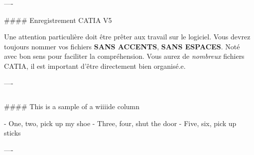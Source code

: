 \documentclass{beamer}
\begin{document}
\begin{frame}[fragile]
\begin{columns}[T]
\begin{column}{.46\textwidth}
\begin{markdown}
----


#### Enregistrement CATIA V5

Une attention particulière doit être prêter aux travail sur le logiciel. Vous devrez toujours nommer vos fichiers \textbf{SANS ACCENTS}, \textbf{SANS ESPACES}. Noté avec bon sens pour faciliter la compréhension. Vous aurez de \textit{nombreux} fichiers CATIA, il est important d'être directement bien organisé.e.

----

\end{markdown}
\end{column}
\end{columns}


\begin{markdown}

#### This is a sample of a wiiiide column

- One, two, pick up my shoe
- Three, four, shut the door
- Five, six, pick up sticks

----

\end{markdown}

\end{frame}
\end{document}
